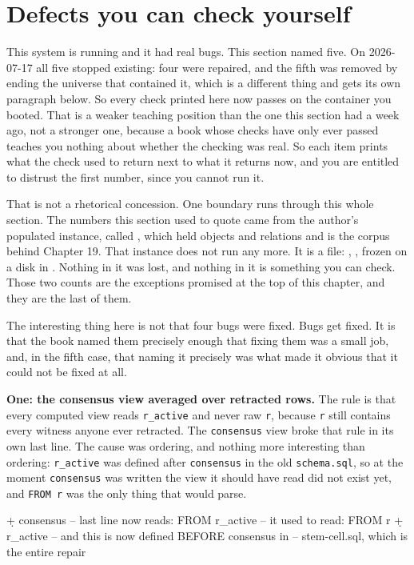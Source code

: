 \section{Defects you can check yourself}
\label{sec:defects}

This system is running and it had real bugs. This section named five. On 2026-07-17 all five stopped existing: four were repaired, and the fifth was removed by ending the universe that contained it, which is a different thing and gets its own paragraph below. So every check printed here now passes on the container you booted. That is a weaker teaching position than the one this section had a week ago, not a stronger one, because a book whose checks have only ever passed teaches you nothing about whether the checking was real. So each item prints what the check used to return next to what it returns now, and you are entitled to distrust the first number, since you cannot run it.

That is not a rhetorical concession. One boundary runs through this whole section. The numbers this section used to quote came from the author's populated instance, called \labLineageName{}, which held \labLineageObjects{} objects and \labLineageRelations{} relations and is the corpus behind Chapter 19. That instance does not run any more. It is a file: \texttt{\labLineageDump}, \labLineageSize{}, frozen on a disk in \labLineagePlace{}. Nothing in it was lost, and nothing in it is something you can check. Those two counts are the exceptions promised at the top of this chapter, and they are the last of them.

The interesting thing here is not that four bugs were fixed. Bugs get fixed. It is that the book named them precisely enough that fixing them was a small job, and, in the fifth case, that naming it precisely was what made it obvious that it could not be fixed at all.

\textbf{One: the consensus view averaged over retracted rows.} The rule is that every computed view reads \texttt{r\_active} and never raw \texttt{r}, because \texttt{r} still contains every witness anyone ever retracted. The \texttt{consensus} view broke that rule in its own last line. The cause was ordering, and nothing more interesting than ordering: \texttt{r\_active} was defined after \texttt{consensus} in the old \texttt{schema.sql}, so at the moment \texttt{consensus} was written the view it should have read did not exist yet, and \texttt{FROM r} was the only thing that would parse.

\begin{Check}
\d+ consensus            -- last line now reads: FROM r_active
                         -- it used to read:     FROM r
\d+ r_active             -- and this is now defined BEFORE consensus in
                         -- stem-cell.sql, which is the entire repair
\end{Check}

